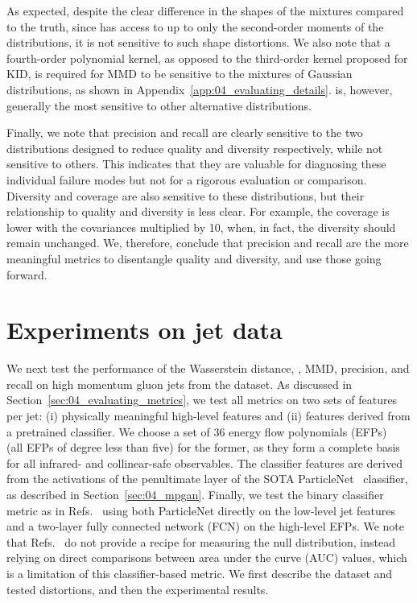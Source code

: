 As expected, despite the clear difference in the shapes of the mixtures compared to the truth, since \fgdinf has access to up to only the second-order moments of the distributions, it is not sensitive to such shape distortions.
We also note that a fourth-order polynomial kernel, as opposed to the third-order kernel proposed for KID, is required for MMD to be sensitive to the mixtures of Gaussian distributions, as shown in Appendix~\ref{app:04_evaluating_details}.
\fgdinf is, however, generally the most sensitive to other alternative distributions.

Finally, we note that precision and recall are clearly sensitive to the two distributions designed to reduce quality and diversity respectively, while not sensitive to others.
This indicates that they are valuable for diagnosing these individual failure modes but not for a rigorous evaluation or comparison.
Diversity and coverage are also sensitive to these distributions, but their relationship to quality and diversity is less clear.
For example, the coverage is lower with the covariances multiplied by 10, when, in fact, the diversity should remain unchanged.
We, therefore, conclude that precision and recall are the more meaningful metrics to disentangle quality and diversity, and use those going forward.

\section{Experiments on jet data}
\label{sec:04_evaluating_jetdata}

We next test the performance of the Wasserstein distance, \fgdinf, MMD, precision, and recall on high momentum gluon jets from the \jetnet dataset.
As discussed in Section~\ref{sec:04_evaluating_metrics}, we test all metrics on two sets of features per jet: (i) physically meaningful high-level features and (ii) features derived from a pretrained classifier.
We choose a set of 36 energy flow polynomials (EFPs)~\cite{Komiske:2017aww} (all EFPs of degree less than five) for the former, as they form a complete basis for all infrared- and collinear-safe observables.
The classifier features are derived from the activations of the penultimate layer of the SOTA ParticleNet~\cite{Qu:2019gqs} classifier, as described in Section~\ref{sec:04_mpgan}.
Finally, we test the binary classifier metric as in Refs.~\cite{krause_caloflow, calochallenge} using both ParticleNet directly on the low-level jet features and a two-layer fully connected network (FCN) on the high-level EFPs.
We note that Refs.~\cite{krause_caloflow, calochallenge} do not provide a recipe for measuring the null distribution, instead relying on direct comparisons between area under the curve (AUC) values, which is a limitation of this classifier-based metric.
We first describe the dataset and tested distortions, and then the experimental results.

